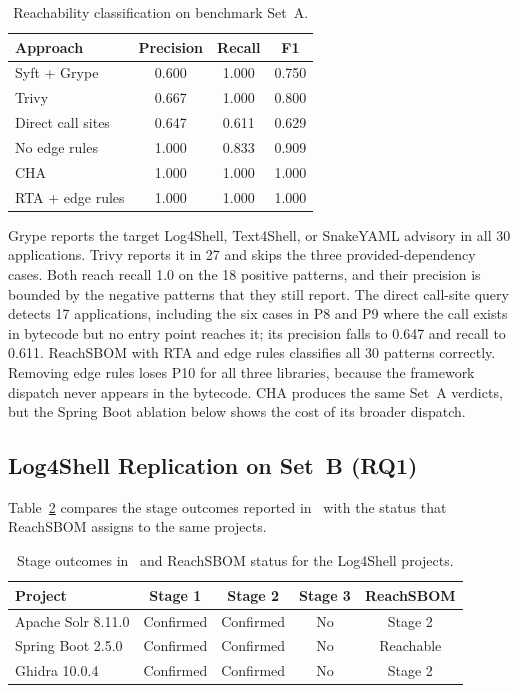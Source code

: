 \documentclass[conference]{IEEEtran}
\begin{document}
\begin{table}[t]
\caption{Reachability classification on benchmark Set~A.}
\label{tab:seta}
\centering
\footnotesize
\renewcommand{\arraystretch}{1.1}
\setlength{\tabcolsep}{3pt}
\begin{tabular}{@{}lccc@{}}
\toprule
Approach & Precision & Recall & F1 \\
\midrule
Syft + Grype & 0.600 & 1.000 & 0.750 \\
Trivy & 0.667 & 1.000 & 0.800 \\
Direct call sites & 0.647 & 0.611 & 0.629 \\
No edge rules & 1.000 & 0.833 & 0.909 \\
CHA & 1.000 & 1.000 & 1.000 \\
RTA + edge rules & 1.000 & 1.000 & 1.000 \\
\bottomrule
\end{tabular}
\end{table}

Grype reports the target Log4Shell, Text4Shell, or SnakeYAML advisory in all 30 applications. Trivy reports it in 27 and skips the three provided-dependency cases. Both reach recall 1.0 on the 18 positive patterns, and their precision is bounded by the negative patterns that they still report. The direct call-site query detects 17 applications, including the six cases in P8 and P9 where the call exists in bytecode but no entry point reaches it; its precision falls to 0.647 and recall to 0.611. ReachSBOM with RTA and edge rules classifies all 30 patterns correctly. Removing edge rules loses P10 for all three libraries, because the framework dispatch never appears in the bytecode. CHA produces the same Set~A verdicts, but the Spring Boot ablation below shows the cost of its broader dispatch.

\subsection{Log4Shell Replication on Set~B (RQ1)}
Table~\ref{tab:setb} compares the stage outcomes reported in~\cite{grgic} with the status that ReachSBOM assigns to the same projects.

\begin{table}[t]
\caption{Stage outcomes in~\cite{grgic} and ReachSBOM status for the Log4Shell projects.}
\label{tab:setb}
\centering
\scriptsize
\setlength{\tabcolsep}{3pt}
\renewcommand{\arraystretch}{1.1}
\begin{tabular}{@{}lcccc@{}}
\toprule
Project & Stage 1 & Stage 2 & Stage 3 & ReachSBOM \\
\midrule
Apache Solr 8.11.0 & Confirmed & Confirmed & No & Stage 2 \\
Spring Boot 2.5.0 & Confirmed & Confirmed & No & Reachable \\
Ghidra 10.0.4 & Confirmed & Confirmed & No & Stage 2 \\
\bottomrule
\end{tabular}
\end{table}
\end{document}
